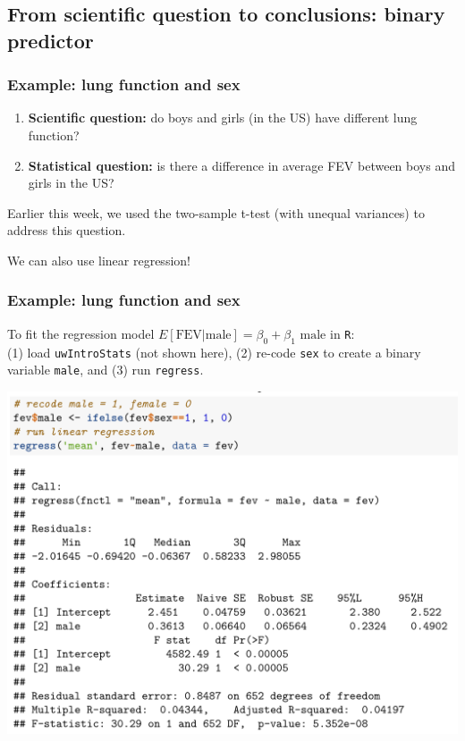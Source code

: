 \documentclass[12pt, 
hyperref={colorlinks=true, linkcolor=blue, urlcolor=cyan},dvipsnames]{beamer}
\begin{document}
\subsection{From scientific question to conclusions: binary predictor}
\begin{frame}
\frametitle{Example: lung function and sex}

\begin{enumerate}
\item \textbf{Scientific question:} do boys and girls (in the US) have different lung function?
\item \textbf{Statistical question:} is there a difference in average FEV between boys and girls in the US?
\end{enumerate} 

Earlier this week, we used the two-sample t-test (with unequal variances) to address this question.

We can also use linear regression!
\end{frame}

\begin{frame}
\frametitle{Example: lung function and sex}
To fit the regression model \color{blue} $E[\text{FEV}|\text{male}] = \beta_0 + \beta_1 \text{ male}$ \color{black} in \texttt{R}:\\ (1) load \texttt{uwIntroStats} (not shown here), (2) re-code \texttt{sex} to create a binary variable \texttt{male}, and (3) run \texttt{regress}. \vspace{-0.5cm}

\center
\includegraphics[width=0.6\paperwidth]{./plots/regress_fev_vs_sex}

\end{frame}
\end{document}
